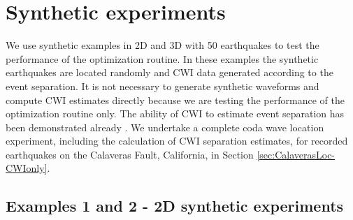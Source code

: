 \documentclass[extra, onecolumn, doublespacing]{gji}
\begin{document}
\section{Synthetic experiments}
\label{sec:benchmarking}

We use synthetic examples in 2D and 3D with 50 earthquakes to test
the performance of the optimization routine. In these examples the
synthetic earthquakes are located randomly and CWI data generated
according to the event separation. It is not necessary to generate
synthetic waveforms and compute CWI estimates directly because we
are testing the performance of the optimization routine only. The
ability of CWI to estimate event separation has been demonstrated
already \citep{dr_Snieder05a, dr_Robinson07b, dr_Robinson11a}. We
undertake a complete coda wave location experiment, including the
calculation of CWI separation estimates, for recorded earthquakes on
the Calaveras Fault, California, in Section
\ref{sec:CalaverasLoc-CWIonly}.

\subsection{Examples 1 and 2 - 2D synthetic experiments}
\end{document}
